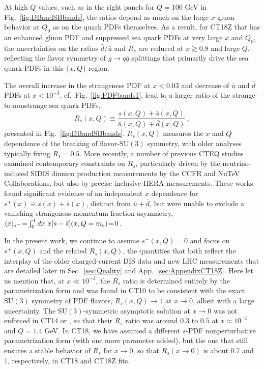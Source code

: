 At high $Q$ values, such as in the right panels for $Q=100 $ GeV in Fig.~\ref{fig:DBandSBbands}, the ratios depend as much on the large-$x$ gluon behavior at $Q_0$ as on the quark PDFs themselves. As a result, for CT18Z that has an enhanced gluon PDF and suppressed sea quark PDFs at very large $x$ and $Q_0$, the uncertainties on the ratios $\bar d/\bar u$ and $R_s$ are reduced at $x\gtrsim 0.8$ and large $Q$, reflecting the flavor symmetry of $g\rightarrow q\bar q$ splittings that primarily drive the sea quark PDFs in this $\{x,Q\}$ region. 

The overall increase in the strangeness PDF at $ x < 0.03$ and decrease of $\bar u$ and $\bar d$ PDFs at $ x  < 10 ^{-3}$, cf.~Fig.~\ref{fig:PDFbands1}, lead to a
larger ratio of the strange-to-nonstrange sea quark PDFs,
\begin{equation}
	R_s(x,Q) \equiv \frac{s(x,Q) + \bar{s}(x,Q)}{\bar{u}(x,Q) + \bar{d}(x,Q)}\ ,
\label{eq:Rs}
\end{equation}
presented in
Fig.~\ref{fig:DBandSBbands}. 
$R_s(x,Q)$ measures the $x$ and $Q$ dependence of the breaking of flavor-$\mathrm{SU}(3)$ symmetry,
with older analyses typically fixing $R_s = 0.5$. More recently, a number of previous CTEQ
studies \cite{Lai:2007dq,Olness:2003wz} examined contemporary constraints on $R_s$,
particularly driven by the neutrino-induced SIDIS dimuon production measurements by the CCFR and NuTeV Collaborations, but also by precise inclusive HERA measurements. 
These works found significant evidence of an independent $x$ dependence for $s^+(x)\! \equiv\! s(x)\! +\! \bar{s}(x)$, distinct from $\bar{u}\!+\!\bar{d}$, 
but were unable to exclude a vanishing strangeness momentum fraction  asymmetry,
$\langle x \rangle_{s^-}\! =\! \int^1_0 dx\ x [s-\bar{s}](x,Q=m_c)\! =\! 0$.

In the present work, we continue to assume $s^-(x,Q)=0$ and focus on $s^+(x,Q)$
and the related $R_s(x,Q)$, the quantities that
both reflect the interplay of the older charged-current DIS data and new LHC measurements that are detailed later in Sec.~\ref{sec:Quality} and App.~\ref{sec:AppendixCT18Z}.
Here let us mention that, at $ x  \ll 10 ^{-3}$, the $R_s$
ratio is determined entirely by the parametrization form and was found
in CT10 to be consistent with the exact $\mathrm{SU}(3)$ symmetry of PDF
flavors, $R_s(x,Q) \rightarrow 1$
at $x\rightarrow 0$, albeit with a large uncertainty. 
The $\mathrm{SU}(3)$-symmetric asymptotic solution at $x\rightarrow 0$
was not enforced in CT14 or \CTHERAII, so that their $R_s$ ratio  
was around $0.3$ to $0.5$ at $x\approx 10^{-5}$ and $Q=1.4$ GeV.
In CT18, we have assumed a different $s$-PDF nonperturbative
parametrization form (with one more parameter added), but the one that
still ensures a stable behavior of $R_s$ for $x\! \to\! 0$, so that
$R_s (x \to 0)$ is about 0.7 and 1, respectively, in CT18 and CT18Z
fits. 

